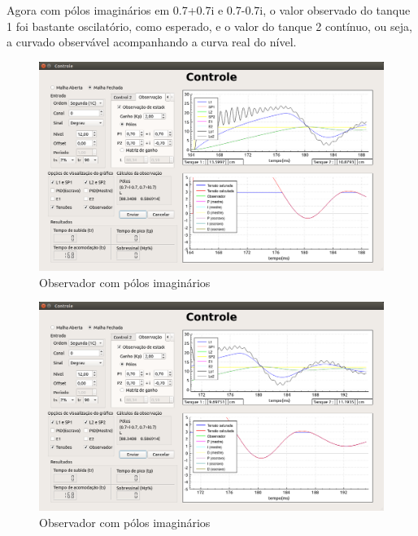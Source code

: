 \documentclass[a4paper,12pt]{article}
\begin{document}
\hspace{4ex}Agora com pólos imaginários em 0.7+0.7i e 0.7-0.7i, o valor observado do tanque 1 foi bastante oscilatório, como esperado, e o valor do tanque 2 contínuo, ou seja, a curvado observável acompanhando a curva real do nível.
\begin{figure}[!h]
\centering
\includegraphics[width=13cm]{FotosObservador/PoloImaginario2}
\caption{Observador com pólos imaginários}
\label{img3}
\end{figure}
\begin{figure}[!h]
\centering
\includegraphics[width=13cm]{FotosObservador/PoloImaginario1}
\caption{Observador com pólos imaginários}
\label{img4}
\end{figure}
\end{document}
